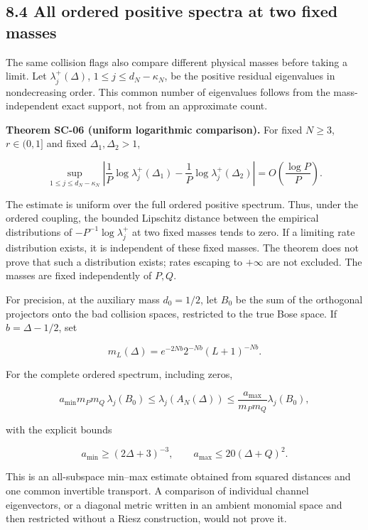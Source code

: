 \documentclass[a4paper,11pt]{article}
\numberwithin{equation}{section}
\begin{document}
\hypertarget{all-ordered-positive-spectra-at-two-fixed-masses}{%
\subsection{8.4 All ordered positive spectra at two fixed masses}\label{all-ordered-positive-spectra-at-two-fixed-masses}}

The same collision flags also compare different physical masses before taking a limit. Let \(\lambda_j^+(\Delta)\), \(1\leq j\leq d_N-\kappa_N\), be the positive residual eigenvalues in nondecreasing order. This common number of eigenvalues follows from the mass-independent exact support, not from an approximate count.

\textbf{Theorem SC-06 (uniform logarithmic comparison).} For fixed \(N\geq3\), \(r\in(0,1]\) and fixed \(\Delta_1,\Delta_2>1\),

\[
\sup_{1\leq j\leq d_N-\kappa_N}
\left|\frac1P\log\lambda_j^+(\Delta_1)
-\frac1P\log\lambda_j^+(\Delta_2)\right|
=O\!\left(\frac{\log P}{P}\right).
\]

The estimate is uniform over the full ordered positive spectrum. Thus, under the ordered coupling, the bounded Lipschitz distance between the empirical distributions of \(-P^{-1}\log\lambda_j^+\) at two fixed masses tends to zero. If a limiting rate distribution exists, it is independent of these fixed masses. The theorem does not prove that such a distribution exists; rates escaping to \(+\infty\) are not excluded. The masses are fixed independently of \(P,Q\).

For precision, at the auxiliary mass \(d_0=1/2\), let \(B_0\) be the sum of the orthogonal projectors onto the bad collision spaces, restricted to the true Bose space. If \(b=\Delta-1/2\), set

\[
m_L(\Delta)=e^{-2Nb}2^{-Nb}(L+1)^{-Nb}.
\]

For the complete ordered spectrum, including zeros,

\[
a_{\min}m_Pm_Q\,\lambda_j(B_0)
\leq\lambda_j(A_N(\Delta))
\leq\frac{a_{\max}}{m_Pm_Q}\lambda_j(B_0),
\]

with the explicit bounds

\[
a_{\min}\geq(2\Delta+3)^{-3},\qquad
a_{\max}\leq20(\Delta+Q)^2.
\]

This is an all-subspace min--max estimate obtained from squared distances and one common invertible transport. A comparison of individual channel eigenvectors, or a diagonal metric written in an ambient monomial space and then restricted without a Riesz construction, would not prove it.
\end{document}
